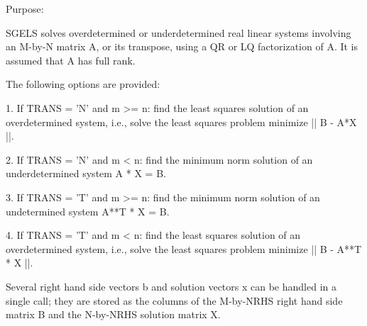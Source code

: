  \begin{DoxyParagraph}{Purpose\+: }
\begin{DoxyVerb} SGELS solves overdetermined or underdetermined real linear systems
 involving an M-by-N matrix A, or its transpose, using a QR or LQ
 factorization of A.  It is assumed that A has full rank.

 The following options are provided: 

 1. If TRANS = 'N' and m >= n:  find the least squares solution of
    an overdetermined system, i.e., solve the least squares problem
                 minimize || B - A*X ||.

 2. If TRANS = 'N' and m < n:  find the minimum norm solution of
    an underdetermined system A * X = B.

 3. If TRANS = 'T' and m >= n:  find the minimum norm solution of
    an undetermined system A**T * X = B.

 4. If TRANS = 'T' and m < n:  find the least squares solution of
    an overdetermined system, i.e., solve the least squares problem
                 minimize || B - A**T * X ||.

 Several right hand side vectors b and solution vectors x can be 
 handled in a single call; they are stored as the columns of the
 M-by-NRHS right hand side matrix B and the N-by-NRHS solution 
 matrix X.\end{DoxyVerb}
 
\end{DoxyParagraph}

